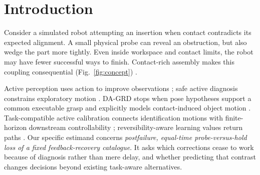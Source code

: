 \begin{abstract}
A diagnostic action changes both what an autonomous robot knows and which task continuations remain possible. An informative contact may preserve conventional motion constraints yet remove an otherwise executable correction. We study this coupling in physics-based robotic simulation through \emph{post-diagnosis recoverability}, the set of fixed feedback corrections that complete the task within the remaining deadline. Our methodology combines a physical belief update, response-contingent recovery, and matched probe-versus-hold interventions that distinguish contact-induced option loss from elapsed time. We formulate two quantitative hypotheses: informative probing causes materially frequent recovery-option erasure, and modeling its consequences improves task completion relative to constrained information seeking. An exact finite-world illustration demonstrates the conflict; a prospective contact-rich assembly study specifies the probes, controls, recovery policies and statistical tests needed to establish its prevalence and consequences. The result is a testable methodology for judging diagnosis by both information gained and task recovery retained.
\end{abstract}



\section{Introduction}
Consider a simulated robot attempting an insertion when contact contradicts its expected alignment. A small physical probe can reveal an obstruction, but also wedge the part more tightly. Even inside workspace and contact limits, the robot may have fewer successful ways to finish. Contact-rich assembly makes this coupling consequential (Fig.~\ref{fig:concept}) \citep{tang2023,tao2025}.

Active perception uses action to improve observations \citep{bohg2017}; safe active diagnosis constrains exploratory motion \citep{ragan2024,sheng2024}. DA-GRD stops when pose hypotheses support a common executable grasp and explicitly models contact-induced object motion \citep{wang2026}. Task-compatible active calibration connects identification motions with finite-horizon downstream controllability \citep{kobayashi2026}; reversibility-aware learning values return paths \citep{grinsztajn2021}. Our specific estimand concerns \emph{postfailure, equal-time probe-versus-hold loss of a fixed feedback-recovery catalogue}. It asks which corrections cease to work because of diagnosis rather than mere delay, and whether predicting that contrast changes decisions beyond existing task-aware alternatives.

